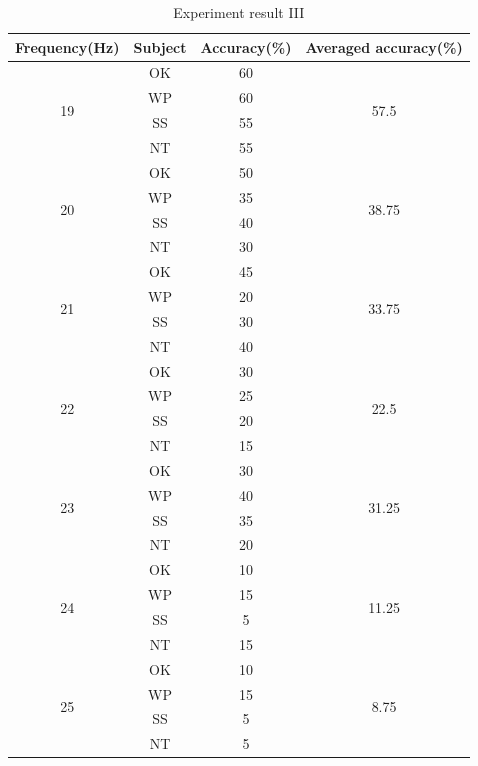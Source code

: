 \begin{table}[ht]
\centering
\begin{tabular}{| c | c | c | c |}   

    \hline
	\textbf{Frequency(Hz)}&
	\textbf{Subject}&
	\textbf{Accuracy(\%)}&
	\textbf{Averaged accuracy(\%)}\\
            \hline
            \multirow{4}{*}{19}&OK&60&\multirow{4}{*}{57.5} \\
			\cline{2-3}
			&WP&60& \\ \cline{2-3}
			&SS&55& \\ \cline{2-3}
			&NT&55& \\
            \hline
            \multirow{4}{*}{20}&OK&50&\multirow{4}{*}{38.75} \\
			\cline{2-3}
			&WP&35& \\ \cline{2-3}
			&SS&40& \\ \cline{2-3}
			&NT&30& \\
            \hline
            \multirow{4}{*}{21}&OK&45&\multirow{4}{*}{33.75} \\
			\cline{2-3}
			&WP&20& \\ \cline{2-3}
			&SS&30& \\ \cline{2-3}
			&NT&40& \\
            \hline
            \multirow{4}{*}{22}&OK&30&\multirow{4}{*}{22.5} \\
			\cline{2-3}
			&WP&25& \\ \cline{2-3}
			&SS&20& \\ \cline{2-3}
			&NT&15& \\
            \hline
            \multirow{4}{*}{23}&OK&30&\multirow{4}{*}{31.25} \\
			\cline{2-3}
			&WP&40& \\ \cline{2-3}
			&SS&35& \\ \cline{2-3}
			&NT&20& \\
            \hline
            \multirow{4}{*}{24}&OK&10&\multirow{4}{*}{11.25} \\
			\cline{2-3}
			&WP&15& \\ \cline{2-3}
			&SS&5& \\ \cline{2-3}
			&NT&15& \\
            \hline
            \multirow{4}{*}{25}&OK&10&\multirow{4}{*}{8.75} \\
			\cline{2-3}
			&WP&15& \\ \cline{2-3}
			&SS&5& \\ \cline{2-3}
			&NT&5& \\
            \hline
            \end{tabular}       
\caption{Experiment result III}
\label{table:result3_2}
\end{table}

